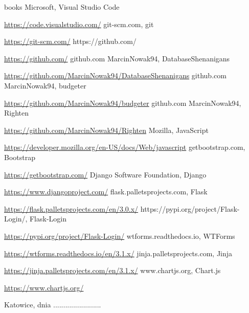 \documentclass[a4paper, 10pt, twoside, openright]{report}
\begin{document}
\begin{large}
\begin{thebibliography} {books}
     Microsoft, Visual Studio Code \raggedright\url{
        https://code.visualstudio.com/}
     git-scm.com, git \raggedright\url{
        https://git-scm.com/}
     https://github.com/ \raggedright\url{
        https://github.com/}
     github.com MarcinNowak94, DatabaseShenanigans \raggedright\url{
        https://github.com/MarcinNowak94/DatabaseShenanigans}
     github.com MarcinNowak94, budgeter \raggedright\url{
        https://github.com/MarcinNowak94/budgeter}
     github.com MarcinNowak94, Righten \raggedright\url{
        https://github.com/MarcinNowak94/Righten}
     Mozilla, JavaScript \raggedright\url{
        https://developer.mozilla.org/en-US/docs/Web/javascript}
     getbootstrap.com, Bootstrap \raggedright\url{
        https://getbootstrap.com/}
     Django Software Foundation, Django \raggedright\url{
        https://www.djangoproject.com/}
     flask.palletsprojects.com, Flask \raggedright\url{
        https://flask.palletsprojects.com/en/3.0.x/}
     https://pypi.org/project/Flask-Login/, Flask-Login \raggedright\url{
        https://pypi.org/project/Flask-Login/}
     wtforms.readthedocs.io, WTForms \raggedright\url{
        https://wtforms.readthedocs.io/en/3.1.x/}
     jinja.palletsprojects.com, Jinja \raggedright\url{
        https://jinja.palletsprojects.com/en/3.1.x/}
     www.chartjs.org, Chart.js \raggedright\url{
        https://www.chartjs.org/}
\end{thebibliography}

\listoffigures
\listoftables
\lstlistoflistings

\newpage\null

\newpage
\begin{flushright}
    {Katowice, dnia ........................}
\end{flushright}

\smallskip


\end{large}
\end{document}

